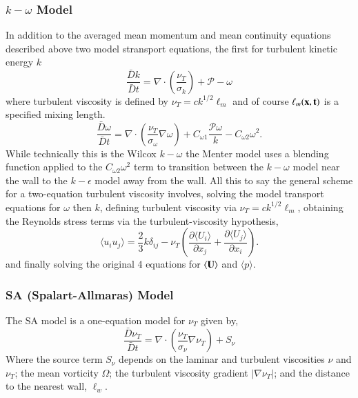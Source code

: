 \documentclass[12pt,letterpaper]{article}
\begin{document}
\subsubsection{\textbf{$k-\omega$ Model}} In addition to the averaged mean momentum and mean continuity equations described above two model stransport equations, the first for turbulent kinetic energy $k$
\begin{equation}
     \frac{\bar{D}k}{\bar{D}t} = \nabla \cdot \left(\frac{\nu_T}{\sigma_k}\right) + \mathcal{P} - \omega
\end{equation}
where turbulent viscosity is defined by $\nu_T = ck^{1/2}\ell_m$ and of course $\ell_m(\bf{x}, t)$ is a specified mixing length.
\begin{equation}
    \frac{\bar{D}\omega}{\bar{D}t} = \nabla \cdot \left(\frac{\nu_T}{\sigma_\omega} \nabla \omega \right) + C_{\omega 1}\frac{\mathcal{P}\omega}{k} - C_{\omega 2} \omega^2. 
\end{equation}
While technically this is the Wilcox $k - \omega$ \cite{Wilcox93} the Menter model uses a blending function applied to the $C_{\omega2} \omega^2$ term to transition between the $k-\omega$ model near the wall to the $k-\epsilon$ model away from the wall. All this to say the general scheme for a two-equation turbulent viscosity involves, solving the model transport equations for $\omega$ then $k$, defining turbulent viscosity via $\nu_T = ck^{1/2}\ell_m$, obtaining the Reynolds stress terms via the turbulent-viscosity hypothesis, 
\begin{equation}
    \langle u_i u_j \rangle = \frac{2}{3} k \delta_{ij} - \nu_T \left(\frac{\partial \langle U_i \rangle }{\partial x_j} + \frac{\partial \langle U_j \rangle}{\partial x_i} \right).
\end{equation}
and finally solving the original 4 equations for $\langle   \bf{U}\rangle$ and $\langle p \rangle$. \\

\subsubsection{\textbf{SA (Spalart-Allmaras) Model}} The SA model \cite{SAModel} is a one-equation model for $\nu_T$ given by, 
\begin{equation}
    \frac{\bar{D}\nu_T}{\bar{D}t} = \nabla \cdot \left(\frac{\nu_T}{\sigma_\nu} \nabla \nu_T \right) + S_\nu
\end{equation}
Where the source term $S_\nu$ depends on the laminar and turbulent viscosities $\nu$ and $\nu_T$; the mean vorticity $\Omega$; the turbulent viscosity gradient $|\nabla \nu_T|$; and the distance to the nearest wall, $\ell_w$. 
\end{document}
